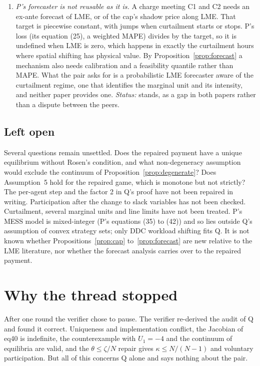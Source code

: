 \documentclass{article}
\begin{document}
\begin{enumerate}
\item \emph{P's forecaster is not reusable as it is.} A charge meeting C1 and C2 needs an ex-ante forecast of LME, or of the cap's shadow price along LME. That target is piecewise constant, with jumps when curtailment starts or stops. P's loss (its equation (25), a weighted MAPE) divides by the target, so it is undefined when LME is zero, which happens in exactly the curtailment hours where spatial shifting has physical value. By Proposition~\ref{prop:forecast} a mechanism also needs calibration and a feasibility quantile rather than MAPE. What the pair asks for is a probabilistic LME forecaster aware of the curtailment regime, one that identifies the marginal unit and its intensity, and neither paper provides one. \emph{Status:} stands, as a gap in both papers rather than a dispute between the peers.
\end{enumerate}

\subsection{Left open}

Several questions remain unsettled.
Does the repaired payment have a unique equilibrium without Rosen's condition, and what non-degeneracy assumption would exclude the continuum of Proposition~\ref{prop:degenerate}?
Does Assumption~5 hold for the repaired game, which is monotone but not strictly?
The per-agent step and the factor 2 in Q's proof have not been repaired in writing.
Participation after the change to slack variables has not been checked.
Curtailment, several marginal units and line limits have not been treated.
P's MESS model is mixed-integer (P's equations (35) to (42)) and so lies outside Q's assumption of convex strategy sets; only DDC workload shifting fits Q.
It is not known whether Propositions~\ref{prop:cap} to~\ref{prop:forecast} are new relative to the LME literature, nor whether the forecast analysis carries over to the repaired payment.

\section{Why the thread stopped}\label{sec:stop}

After one round the verifier chose to pause.
The verifier re-derived the audit of Q and found it correct.
Uniqueness and implementation conflict, the Jacobian of eq40 is indefinite, the counterexample with \(U_1=-4\) and the continuum of equilibria are valid, and the \(\theta\le\zeta/N\) repair gives \(\kappa\le N/(N-1)\) and voluntary participation.
But all of this concerns Q alone and says nothing about the pair.
\end{document}
